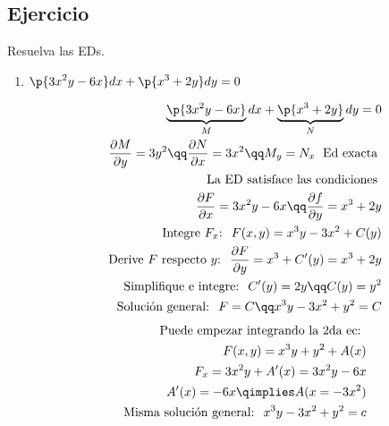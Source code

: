 \subsection{Ejercicio}
Resuelva las EDs.
\begin{enumerate}
    \item $\displaystyle \p{3x^2y-6x}dx + \p{x^3+2y}dy = 0$ 
        \begin{center}
           \begin{align*}
                \underbrace{\p{3x^2y-6x}}_{M}dx + \underbrace{\p{x^3+2y}}_{N}dy = 0 \\ 
                \frac{\partial M}{\partial y} = 3y^2 \qq \frac{\partial N}{\partial x} = 3x^2 \qq M_y = N_x \; \text{ Ed exacta }\\ 
                \text{ La ED satisface las condiciones   } \\ 
                \frac{\partial F}{\partial x} = 3x^2y-6x \qq \frac{\partial f}{\partial y} = x^3+2y \\ 
                \text{ Integre $F_x$: }\; F(x,y) = x^3y-3x^2+C(y) \\ 
                \text{ Derive $F$ respecto  $y$: } \; \frac{\partial F}{\partial y} = x^3+C'(y)=x^3+2y \\ 
                \text{ Simplifique e integre: }\; C'(y)=2y \qq C(y)=y^2 \\ 
                \text{ Solución general: }\; F=C \qq x^3y-3x^2+y^2=C \\                 
           \end{align*}
           \hlinefill
            \begin{align*}
            \text{ Puede empezar integrando la 2da ec: } \\ 
            F(x,y) = x^3y+y^2+A(x) \\ 
            F_x = 3x^2y+A'(x)=3x^2y-6x \\ 
            A'(x)=-6x \qimplies A(x = -3x^2) \\ 
            \text{ Misma solución general: }\; x^3y-3x^2+y^2=c \\ 
            \end{align*}
        \end{center}
    

\end{enumerate}
